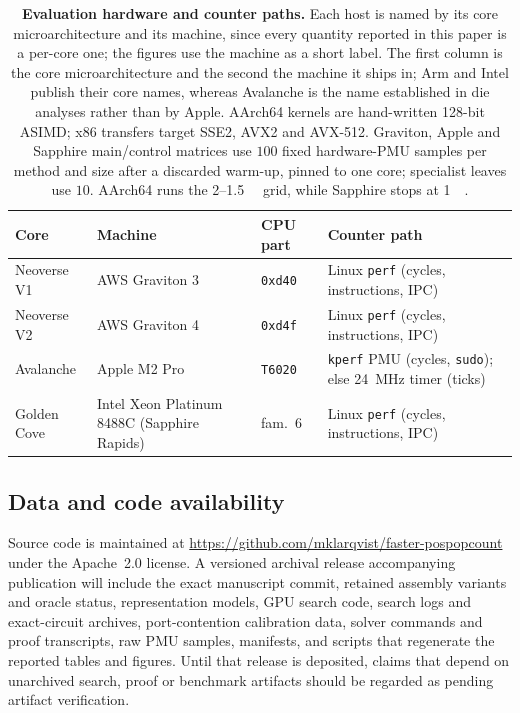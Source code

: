 \documentclass[fleqn,10pt]{wlscirep}
\begin{document}
\begin{table}[!t]
\centering
\caption{\label{tab:hardware}\textbf{Evaluation hardware and counter paths.} Each host is named by its core microarchitecture and its machine, since every quantity reported in this paper is a per-core one; the figures use the machine as a short label. The first column is the core microarchitecture and the second the machine it ships in; Arm and Intel publish their core names, whereas Avalanche is the name established in die analyses rather than by Apple. AArch64 kernels are hand-written 128-bit ASIMD; x86 transfers target SSE2, AVX2 and AVX-512. Graviton, Apple and Sapphire main/control matrices use $100$ fixed hardware-PMU samples per method and size after a discarded warm-up, pinned to one core; specialist leaves use $10$. AArch64 runs the \SI{2}{\byte}--\SI{1.5}{\gibi\byte} grid, while Sapphire stops at \SI{1}{\gibi\byte}.}
\small\setlength{\tabcolsep}{4pt}
\begin{tabular}{@{}l | l l p{}@{}}
\toprule
Core & Machine & CPU part & Counter path\\
\midrule
Neoverse V1 & AWS Graviton 3 & \texttt{0xd40} & Linux \texttt{perf} (cycles, instructions, IPC)\\
Neoverse V2 & AWS Graviton 4 & \texttt{0xd4f} & Linux \texttt{perf} (cycles, instructions, IPC)\\
Avalanche & Apple M2 Pro & \texttt{T6020} & \texttt{kperf} PMU (cycles, \texttt{sudo}); else \SI{24}{\mega\hertz} timer (ticks)\\
Golden Cove & Intel Xeon Platinum 8488C (Sapphire Rapids) & fam.\ 6 & Linux \texttt{perf} (cycles, instructions, IPC)\\
\bottomrule
\end{tabular}
\end{table}

\subsection*{Data and code availability}
Source code is maintained at \url{https://github.com/mklarqvist/faster-pospopcount} under the Apache~2.0 license. A versioned archival release accompanying publication will include the exact manuscript commit, retained assembly variants and oracle status, representation models, GPU search code, search logs and exact-circuit archives, port-contention calibration data, solver commands and proof transcripts, raw PMU samples, manifests, and scripts that regenerate the reported tables and figures. Until that release is deposited, claims that depend on unarchived search, proof or benchmark artifacts should be regarded as pending artifact verification.
\end{document}
